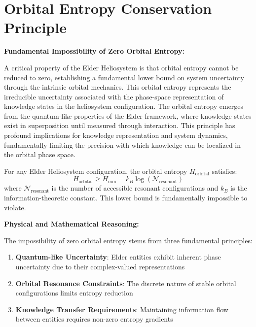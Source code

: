 \section{Orbital Entropy Conservation Principle}

\textbf{Fundamental Impossibility of Zero Orbital Entropy:}

A critical property of the Elder Heliosystem is that orbital entropy cannot be reduced to zero, establishing a fundamental lower bound on system uncertainty through the intrinsic orbital mechanics. This orbital entropy represents the irreducible uncertainty associated with the phase-space representation of knowledge states in the heliosystem configuration. The orbital entropy emerges from the quantum-like properties of the Elder framework, where knowledge states exist in superposition until measured through interaction. This principle has profound implications for knowledge representation and system dynamics, fundamentally limiting the precision with which knowledge can be localized in the orbital phase space.

\begin{theorem}
For any Elder Heliosystem configuration, the orbital entropy $H_{\text{orbital}}$ satisfies:
\begin{equation}
H_{\text{orbital}} \geq H_{\min} = k_B \log(\mathcal{N}_{\text{resonant}})
\end{equation}
where $\mathcal{N}_{\text{resonant}}$ is the number of accessible resonant configurations and $k_B$ is the information-theoretic constant. This lower bound is fundamentally impossible to violate.
\end{theorem}

\textbf{Physical and Mathematical Reasoning:}

The impossibility of zero orbital entropy stems from three fundamental principles:
\begin{enumerate}
    \item \textbf{Quantum-like Uncertainty}: Elder entities exhibit inherent phase uncertainty due to their complex-valued representations
    \item \textbf{Orbital Resonance Constraints}: The discrete nature of stable orbital configurations limits entropy reduction
    \item \textbf{Knowledge Transfer Requirements}: Maintaining information flow between entities requires non-zero entropy gradients
\end{enumerate}

